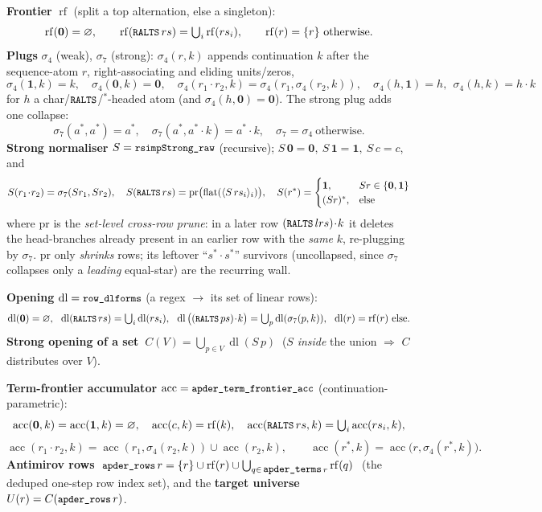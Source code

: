 \documentclass[11pt]{article}
\newcommand{\dlf}{\operatorname{dl}}
\newcommand{\rf}{\operatorname{rf}}
\newcommand{\acc}{\operatorname{acc}}
\newcommand{\Sstrong}{S}
\newcommand{\sfour}{\sigma_4}
\newcommand{\sseven}{\sigma_7}
\newcommand{\Uuniv}{U}
\newcommand{\one}{\mathbf{1}}
\newcommand{\zero}{\mathbf{0}}
\newcommand{\code}[1]{\texttt{\small #1}}
\begin{document}
\textbf{Frontier} $\rf$ (split a top alternation, else a singleton):
\[
\rf(\zero)=\varnothing,\qquad \rf(\code{RALTS}\,rs)=\textstyle\bigcup_i\rf(rs_i),\qquad \rf(r)=\{r\}\ \text{otherwise}.
\]
\textbf{Plugs} $\sfour$ (weak), $\sseven$ (strong): $\sfour(r,k)$ appends continuation $k$ after the sequence-atom $r$,
right-associating and eliding units/zeros,
\[
\sfour(\one,k)=k,\quad \sfour(\zero,k)=\zero,\quad \sfour(r_1\!\cdot\! r_2,k)=\sfour(r_1,\sfour(r_2,k)),\quad
\sfour(h,\one)=h,\ \ \sfour(h,k)=h\!\cdot\! k
\]
for $h$ a char/$\code{RALTS}$/${}^{*}$-headed atom (and $\sfour(h,\zero)=\zero$). The strong plug adds one collapse:
\[
\sseven(a^{*},a^{*})=a^{*},\quad \sseven(a^{*},a^{*}\!\cdot\! k)=a^{*}\!\cdot\! k,\quad \sseven=\sfour\ \text{otherwise}.
\]
\textbf{Strong normaliser} $\Sstrong=\code{rsimpStrong\_raw}$ (recursive); $\Sstrong\,\zero=\zero,\ \Sstrong\,\one=\one,\ \Sstrong\,c=c$, and
\[
\Sstrong(r_1\!\cdot\! r_2)=\sseven(\Sstrong r_1,\Sstrong r_2),\quad
\Sstrong(\code{RALTS}\,rs)=\mathrm{pr}\big(\mathrm{flat}(\langle\Sstrong\,rs_i\rangle_i)\big),\quad
\Sstrong(r^{*})=\begin{cases}\one,&\Sstrong r\in\{\zero,\one\}\\ (\Sstrong r)^{*},&\text{else}\end{cases}
\]
where $\mathrm{pr}$ is the \emph{set-level cross-row prune}: in a later row $(\code{RALTS}\,lrs)\!\cdot\! k$ it deletes the
head-branches already present in an earlier row with the \emph{same} $k$, re-plugging by $\sseven$. $\mathrm{pr}$ only
\emph{shrinks} rows; its leftover ``$s^{*}\!\cdot\! s^{*}$'' survivors (uncollapsed, since $\sseven$ collapses only a
\emph{leading} equal-star) are the recurring wall.

\textbf{Opening} $\dlf=\code{row\_dlforms}$ (a regex $\to$ its set of linear rows):
\[
\dlf(\zero)=\varnothing,\ \ \dlf(\code{RALTS}\,rs)=\textstyle\bigcup_i\dlf(rs_i),\ \
\dlf\big((\code{RALTS}\,ps)\!\cdot\! k\big)=\textstyle\bigcup_p\dlf(\sseven(p,k)),\ \ \dlf(r)=\rf(r)\ \text{else.}
\]
\textbf{Strong opening of a set} $\ C(V)=\bigcup_{p\in V}\dlf(\Sstrong\,p)\ $ ($\Sstrong$ \emph{inside} the union
$\Rightarrow$ $C$ distributes over $V$).

\textbf{Term-frontier accumulator} $\acc=\code{apder\_term\_frontier\_acc}$ (continuation-parametric):
\[
\acc(\zero,k)=\acc(\one,k)=\varnothing,\quad \acc(c,k)=\rf(k),\quad \acc(\code{RALTS}\,rs,k)=\textstyle\bigcup_i\acc(rs_i,k),
\]
\[
\acc(r_1\!\cdot\! r_2,k)=\acc(r_1,\sfour(r_2,k))\cup\acc(r_2,k),\qquad \acc(r^{*},k)=\acc\big(r,\sfour(r^{*},k)\big).
\]
\textbf{Antimirov rows} $\ \code{apder\_rows}\,r=\{r\}\cup\rf(r)\cup\bigcup_{q\in\,\code{apder\_terms}\,r}\rf(q)\ $ (the
deduped one-step row index set), and the \textbf{target universe} $\Uuniv(r)=C(\code{apder\_rows}\,r)$.
\end{document}
